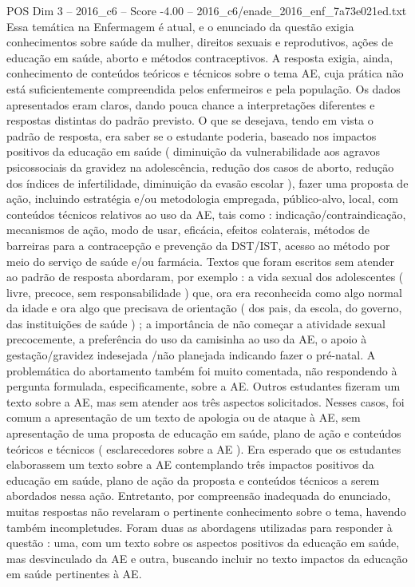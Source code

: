 \begin{textsample}{POS Dim 3 – 2016\_c6 – Score -4.00 – 2016\_c6/enade\_2016\_enf\_7a73e021ed.txt}
Essa temática na Enfermagem é atual, e o enunciado da questão exigia conhecimentos sobre saúde da mulher, direitos sexuais e reprodutivos, ações de educação em saúde, aborto e métodos contraceptivos.
A resposta exigia, ainda, conhecimento de conteúdos teóricos e técnicos sobre o tema AE, cuja prática não está suficientemente compreendida pelos enfermeiros e pela população.
Os dados apresentados eram claros, dando pouca chance a interpretações diferentes e respostas distintas do padrão previsto.
O que se desejava, tendo em vista o padrão de resposta, era saber se o estudante poderia, baseado nos impactos positivos da educação em saúde ( diminuição da vulnerabilidade aos agravos psicossociais da gravidez na adolescência, redução dos casos de aborto, redução dos índices de infertilidade, diminuição da evasão escolar ), fazer uma proposta de ação, incluindo estratégia e/ou metodologia empregada, público-alvo, local, com conteúdos técnicos relativos ao uso da AE, tais como : indicação/contraindicação, mecanismos de ação, modo de usar, eficácia, efeitos colaterais, métodos de barreiras para a contracepção e prevenção da DST/IST, acesso ao método por meio do serviço de saúde e/ou farmácia.
Textos que foram escritos sem atender ao padrão de resposta abordaram, por exemplo : a vida sexual dos adolescentes ( livre, precoce, sem responsabilidade ) que, ora era reconhecida como algo normal da idade e ora algo que precisava de orientação ( dos pais, da escola, do governo, das instituições de saúde ) ; a importância de não começar a atividade sexual precocemente, a preferência do uso da camisinha ao uso da AE, o apoio à gestação/gravidez indesejada /não planejada indicando fazer o pré-natal.
A problemática do abortamento também foi muito comentada, não respondendo à pergunta formulada, especificamente, sobre a AE.
Outros estudantes fizeram um texto sobre a AE, mas sem atender aos três aspectos solicitados.
Nesses casos, foi comum a apresentação de um texto de apologia ou de ataque à AE, sem apresentação de uma proposta de educação em saúde, plano de ação e conteúdos teóricos e técnicos ( esclarecedores sobre a AE ).
Era esperado que os estudantes elaborassem um texto sobre a AE contemplando três impactos positivos da educação em saúde, plano de ação da proposta e conteúdos técnicos a serem abordados nessa ação.
Entretanto, por compreensão inadequada do enunciado, muitas respostas não revelaram o pertinente conhecimento sobre o tema, havendo também incompletudes.
Foram duas as abordagens utilizadas para responder à questão : uma, com um texto sobre os aspectos positivos da educação em saúde, mas desvinculado da AE e outra, buscando incluir no texto impactos da educação em saúde pertinentes à AE.

\end{textsample}

